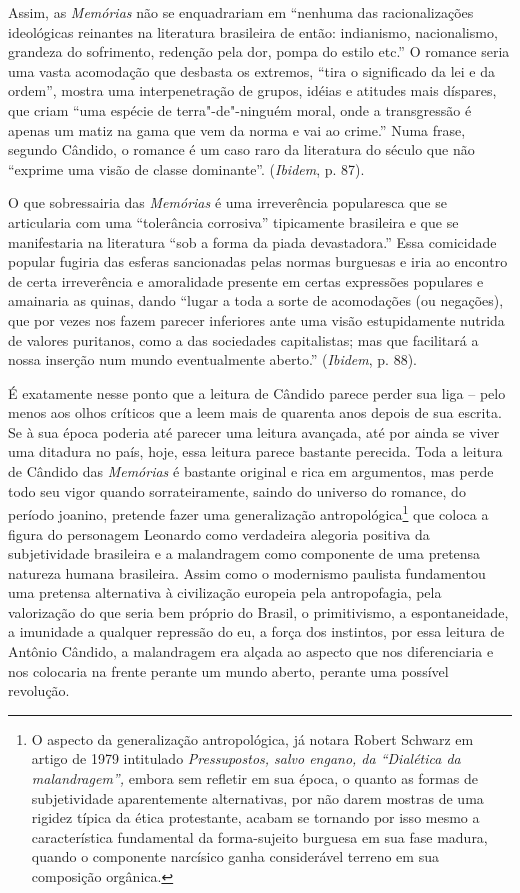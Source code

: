 Assim, as \emph{Memórias} não se enquadrariam em ``nenhuma das
racionalizações ideológicas reinantes na literatura brasileira de então:
indianismo, nacionalismo, grandeza do sofrimento, redenção pela dor,
pompa do estilo etc.'' O romance seria uma vasta acomodação que desbasta
os extremos, ``tira o significado da lei e da ordem'', mostra uma
interpenetração de grupos, idéias e atitudes mais díspares, que criam
``uma espécie de terra"-de"-ninguém moral, onde a transgressão é apenas um
matiz na gama que vem da norma e vai ao crime.'' Numa frase, segundo
Cândido, o romance é um caso raro da literatura do século  que não
``exprime uma visão de classe dominante''. (\emph{Ibidem}, p. 87).

O que sobressairia das \emph{Memórias} é uma irreverência popularesca
que se articularia com uma ``tolerância corrosiva'' tipicamente
brasileira e que se manifestaria na literatura ``sob a forma da piada
devastadora.'' Essa comicidade popular fugiria das esferas sancionadas
pelas normas burguesas e iria ao encontro de certa irreverência e
amoralidade presente em certas expressões populares e amainaria as
quinas, dando ``lugar a toda a sorte de acomodações (ou negações), que
por vezes nos fazem parecer inferiores ante uma visão estupidamente
nutrida de valores puritanos, como a das sociedades capitalistas; mas
que facilitará a nossa inserção num mundo eventualmente aberto.''
(\emph{Ibidem}, p. 88).

É exatamente nesse ponto que a leitura de Cândido parece perder sua liga
-- pelo menos aos olhos críticos que a leem mais de quarenta anos depois
de sua escrita. Se à sua época poderia até parecer uma leitura avançada,
até por ainda se viver uma ditadura no país, hoje, essa leitura parece
bastante perecida. Toda a leitura de Cândido das \emph{Memórias} é
bastante original e rica em argumentos, mas perde todo seu vigor quando
sorrateiramente, saindo do universo do romance, do período joanino,
pretende fazer uma generalização antropológica\footnote{O aspecto da
  generalização antropológica, já notara Robert Schwarz em artigo de
  1979 intitulado \emph{Pressupostos, salvo engano, da ``Dialética da
  malandragem'',} embora sem refletir em sua época, o quanto as formas
  de subjetividade aparentemente alternativas, por não darem mostras de
  uma rigidez típica da ética protestante,  acabam se tornando por isso
  mesmo a característica fundamental da forma-sujeito burguesa em sua
  fase madura, quando o componente narcísico ganha considerável terreno em
  sua composição orgânica.} que coloca a figura do personagem Leonardo
como verdadeira alegoria positiva da subjetividade brasileira e a
malandragem como componente de uma pretensa natureza humana brasileira.
Assim como o modernismo paulista fundamentou uma pretensa alternativa à
civilização europeia pela antropofagia, pela valorização do que seria
bem próprio do Brasil, o primitivismo, a espontaneidade, a imunidade a
qualquer repressão do eu, a força dos instintos, por essa leitura de
Antônio Cândido, a malandragem era alçada ao aspecto que nos
diferenciaria e nos colocaria na frente perante um mundo aberto, perante
uma possível revolução.


